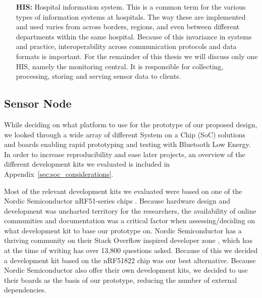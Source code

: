 \begin{itemize}
  \item[\textbf{HIS:}] Hospital information system. This is a common term for the various types of information systems at hospitals. The way these are implemented and used varies from across borders, regions, and even between different departments within the same hospital. Because of this invariance in systems and practice, interoperability across communication protocols and data formats is important. For the remainder of this thesis we will discuss only one HIS, namely the monitoring central. It is responsible for collecting, processing, storing and serving sensor data to clients.

\end{itemize}



\subsection{Sensor Node} %
\label{sub:node}

While deciding on what platform to use for the prototype of our proposed design, we looked through a wide array of different System on a Chip (SoC) solutions and boards enabling rapid prototyping and testing with Bluetooth Low Energy. In order to increase reproducibility and ease later projects, an overview of the different development kits we evaluated is included in Appendix~\ref{sec:soc_considerations}.

Most of the relevant development kits we evaluated were based on one of the Nordic Semiconductor nRF51-series chips \cite{newRef:36, newRef:36:2}. Because hardware design and development was uncharted territory for the researchers, the availability of online communities and documentation was a critical factor when assessing/deciding on what development kit to base our prototype on. Nordic Semiconductor has a thriving community on their Stack Overflow inspired developer zone \cite{newRef:50}, which has at the time of writing has over 13,800 questions asked. Because of this we decided a development kit based on the nRF51822 chip was our best alternative. Because Nordic Semiconductor also offer their own development kits, we decided to use their boards as the basis of our prototype, reducing the number of external dependencies.

